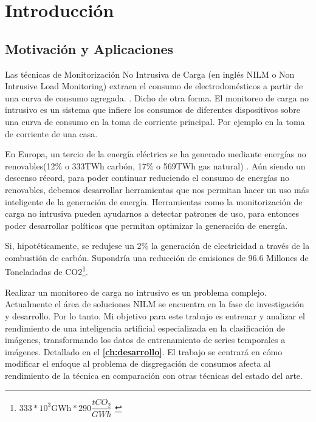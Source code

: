 
\chapter{Introducción}
\label{ch:intro}

\section{Motivación y Aplicaciones}
\label{sec:motivacionyaplicaciones}

Las técnicas de Monitorización No Intrusiva de Carga (en inglés NILM o Non Intrusive Load Monitoring) extraen el consumo de electrodomésticos a partir de una curva de consumo agregada. \autocite[1]{NILMreview2017}. Dicho de otra forma. El monitoreo de carga no intrusivo es un sistema que infiere los consumos de diferentes dispositivos sobre una curva de consumo en la toma de corriente principal. Por ejemplo en la toma de corriente de una casa.

En Europa, un tercio de la energía eléctrica se ha generado mediante energías no renovables(12\% o 333TWh carbón, 17\% o 569TWh gas natural)\autocite{energyeurope} \autocite{ember2024european}. Aún siendo un descenso récord, para poder continuar reduciendo el consumo de energías no renovables, debemos desarrollar herramientas que nos permitan hacer un uso más inteligente de la generación de energía. Herramientas como la monitorización de carga no intrusiva pueden ayudarnos a detectar patrones de uso\autocite[11]{nilmstateoftheart}, para entonces poder desarrollar políticas que permitan optimizar la generación de energía. 

Si, hipotéticamente, se redujese un 2\% la generación de electricidad a través de la combustión de carbón. Supondría una reducción de emisiones de 96.6 Millones de Toneladadas de CO2\footnote{$333*10^3\text{GWh}*290\dfrac{tCO_{2}}{GWh}$ \autocite{postcarbonelectricidad}}.

Realizar un monitoreo de carga no intrusivo es un problema complejo. Actualmente el área de soluciones NILM se encuentra en la fase de investigación y desarrollo. Por lo tanto. Mi objetivo para este trabajo es entrenar y analizar el rendimiento de una inteligencia artificial especializada en la clasificación de imágenes, transformando los datos de entrenamiento de series temporales a imágenes. Detallado en el \textbf{\autoref{ch:desarrollo}}. El trabajo se centrará en cómo modificar el enfoque al problema de disgregación de consumos afecta al rendimiento de la técnica en comparación con otras técnicas del estado del arte. 

